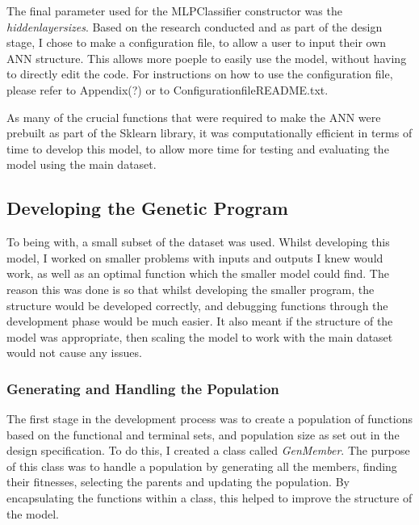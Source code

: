 \documentclass[11pt]{article}
\begin{document}
The final parameter used for the MLPClassifier constructor was the \textit{hidden\textunderscore layer\textunderscore sizes}. Based on the research conducted and as part of the design stage, I chose to make a configuration file, to allow a user to input their own ANN structure. This allows more poeple to easily use the model, without having to directly edit the code. For instructions on how to use the configuration file, please refer to Appendix(?) or to Configuration\textunderscore file\textunderscore README.txt.

As many of the crucial functions that were required to make the ANN were prebuilt as part of the Sklearn library, it was computationally efficient in terms of time to develop this model, to allow more time for testing and evaluating the model using the main dataset. 
\subsection{Developing the Genetic Program}\label{subsec:DEVGP}
To being with, a small subset of the dataset was used. Whilst developing this model, I worked on smaller problems with inputs and outputs I knew would work, as well as an optimal function which the smaller model could find. The reason this was done is so that whilst developing the smaller program, the structure would be developed correctly, and debugging functions through the development phase would be much easier. It also meant if the structure of the model was appropriate, then scaling the model to work with the main dataset would not cause any issues. 
 \subsubsection{Generating and Handling the Population}\label{subsubsec:sf}
The first stage in the development process was to create a population of functions based on the functional and terminal sets, and population size as set out in the design specification. To do this, I created a class called \textit{GenMember}. The purpose of this class was to handle a population by generating all the members, finding their fitnesses, selecting the parents and updating the population. By encapsulating the functions within a class, this helped to improve the structure of the model. 
\end{document}
